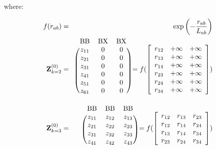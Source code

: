 \documentclass{article}
\begin{document}
\noindent where:

\begin{eqnarray}
f(r_{ab}) & = & \exp{\left( -\frac{r_{ab}}{L_{ab}} \right)} \\
\mathbf{Z}^{(0)}_{k=2} & = & \begin{blockarray}{ccc}
  \mathrm{BB} & \mathrm{BX} & \mathrm{BX} \\
\begin{block}{(ccc)}
	z_{11} & 0        & 0        \\
	z_{21} & 0        & 0        \\
	z_{31} & 0        & 0        \\
	z_{41} & 0        & 0        \\
	z_{51} & 0        & 0        \\
	z_{61} & 0        & 0        \\
\end{block}
\end{blockarray} = 
f(\left[\begin{array}{ccc}
	r_{12} & +\infty  & +\infty  \\
	r_{13} & +\infty  & +\infty  \\
	r_{14} & +\infty  & +\infty  \\
	r_{23} & +\infty  & +\infty  \\
	r_{24} & +\infty  & +\infty  \\
	r_{34} & +\infty  & +\infty  \\
\end{array}
\right]) \\
\mathbf{Z}^{(0)}_{k=3} & = & \begin{blockarray}{ccc}
\mathrm{BB} & \mathrm{BB} & \mathrm{BB} \\ 
\begin{block}{(ccc)}
	z_{11} & z_{12}   & z_{13}   \\
	z_{21} & z_{22}   & z_{23}   \\
	z_{31} & z_{32}   & z_{33}   \\
	z_{41} & z_{42}   & z_{43}   \\
\end{block}
\end{blockarray} =
f(\left[\begin{array}{ccc}
	r_{12} & r_{13}   & r_{23}   \\
	r_{12} & r_{14}   & r_{24}   \\
	r_{13} & r_{14}   & r_{34}   \\
	r_{23} & r_{24}   & r_{34}   \\
\end{array}
\right])
\end{eqnarray}
\end{document}
